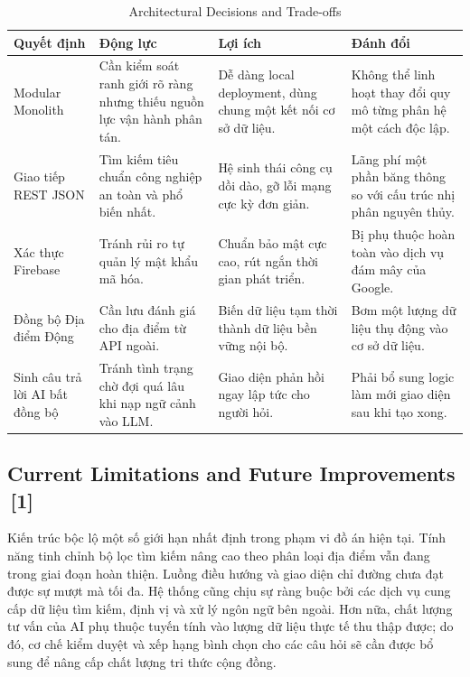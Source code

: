 \documentclass[12pt, a4paper]{article}
\begin{document}
\begin{table}[H]
    \centering
    \renewcommand{\arraystretch}{1.3}
    \begin{tabular}{|p{3.5cm}|p{3.5cm}|p{3.5cm}|p{3.5cm}|}
    \hline
    \textbf{Quyết định} & \textbf{Động lực} & \textbf{Lợi ích} & \textbf{Đánh đổi} \\
    \hline
    Modular Monolith & Cần kiểm soát ranh giới rõ ràng nhưng thiếu nguồn lực vận hành phân tán. & Dễ dàng local deployment, dùng chung một kết nối cơ sở dữ liệu. & Không thể linh hoạt thay đổi quy mô từng phân hệ một cách độc lập. \\
    \hline
    Giao tiếp REST JSON & Tìm kiếm tiêu chuẩn công nghiệp an toàn và phổ biến nhất. & Hệ sinh thái công cụ dồi dào, gỡ lỗi mạng cực kỳ đơn giản. & Lãng phí một phần băng thông so với cấu trúc nhị phân nguyên thủy. \\
    \hline
    Xác thực Firebase & Tránh rủi ro tự quản lý mật khẩu mã hóa. & Chuẩn bảo mật cực cao, rút ngắn thời gian phát triển. & Bị phụ thuộc hoàn toàn vào dịch vụ đám mây của Google. \\
    \hline
    Đồng bộ Địa điểm Động & Cần lưu đánh giá cho địa điểm từ API ngoài. & Biến dữ liệu tạm thời thành dữ liệu bền vững nội bộ. & Bơm một lượng dữ liệu thụ động vào cơ sở dữ liệu. \\
    \hline
    Sinh câu trả lời AI bất đồng bộ & Tránh tình trạng chờ đợi quá lâu khi nạp ngữ cảnh vào LLM. & Giao diện phản hồi ngay lập tức cho người hỏi. & Phải bổ sung logic làm mới giao diện sau khi tạo xong. \\
    \hline
    \end{tabular}
    \caption{Architectural Decisions and Trade-offs}
    \label{tab:arch_tradeoffs}
\end{table}

\subsection[Current Limitations and Future Improvements]{Current Limitations and Future Improvements \,{\normalfont\small\textcolor{cyan!70!black}{[1]}}}
Kiến trúc bộc lộ một số giới hạn nhất định trong phạm vi đồ án hiện tại. Tính năng tinh chỉnh bộ lọc tìm kiếm nâng cao theo phân loại địa điểm vẫn đang trong giai đoạn hoàn thiện. Luồng điều hướng và giao diện chỉ đường chưa đạt được sự mượt mà tối đa. Hệ thống cũng chịu sự ràng buộc bởi các dịch vụ cung cấp dữ liệu tìm kiếm, định vị và xử lý ngôn ngữ bên ngoài. Hơn nữa, chất lượng tư vấn của AI phụ thuộc tuyến tính vào lượng dữ liệu thực tế thu thập được; do đó, cơ chế kiểm duyệt và xếp hạng bình chọn cho các câu hỏi sẽ cần được bổ sung để nâng cấp chất lượng tri thức cộng đồng.
\end{document}

